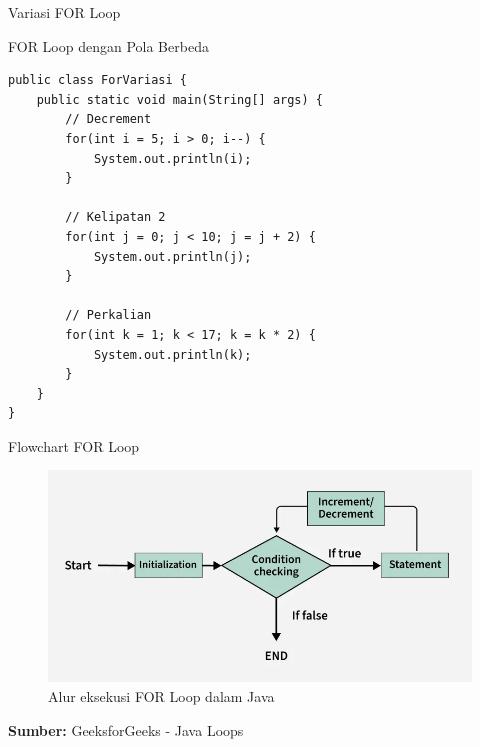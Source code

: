\documentclass{beamer}
\begin{document}
\begin{frame}[fragile]{Variasi FOR Loop}
  \begin{exampleblock}{FOR Loop dengan Pola Berbeda}
    \begin{lstlisting}[basicstyle=\ttfamily\scriptsize]
public class ForVariasi {
    public static void main(String[] args) {
        // Decrement
        for(int i = 5; i > 0; i--) {
            System.out.println(i);
        }
        
        // Kelipatan 2
        for(int j = 0; j < 10; j = j + 2) {
            System.out.println(j);
        }
        
        // Perkalian
        for(int k = 1; k < 17; k = k * 2) {
            System.out.println(k);
        }
    }
}
    \end{lstlisting}
  \end{exampleblock}
\end{frame}

\begin{frame}[fragile]{Flowchart FOR Loop}
  \begin{figure}
    \centering
    \includegraphics[width=0.75\linewidth]{Perulangan/for_loop_flowchart.png}
    \caption{Alur eksekusi FOR Loop dalam Java}
    \label{fig:placeholder}
\end{figure}
  \textbf{Sumber: }GeeksforGeeks - Java Loops
\end{frame}

\end{document}
